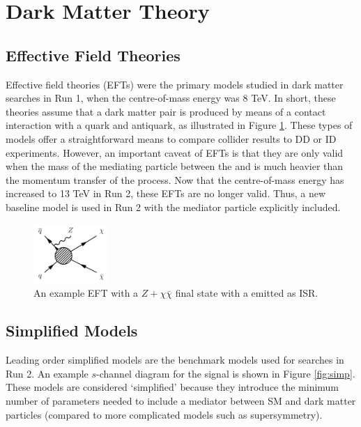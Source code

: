 \label{chapter:theory}

\section{Dark Matter Theory}

\subsection{Effective Field Theories}

Effective field theories (EFTs) were the primary models studied in \etmissX dark matter searches in Run 1, when the centre-of-mass energy was 8 TeV. In short, these theories assume that a dark matter pair is produced by means of a contact interaction with a quark and antiquark, as illustrated in Figure \ref{fig:eft}. These types of models offer a straightforward means to compare collider results to DD or ID experiments. However, an important caveat of EFTs is that they are only valid when the mass of the mediating particle between the \chichi and \qq is much heavier than the momentum transfer of the process. Now that the centre-of-mass energy has increased to 13 TeV in Run 2, these EFTs are no longer valid. Thus, a new baseline model is used in Run 2 with the mediator particle explicitly included.

\begin{figure}[htb]
\centering
\includegraphics[width=0.25\textwidth]{Figures/eft.png}
\caption{An example EFT with a $Z+\chi\bar{\chi}$ final state with a \Z emitted as ISR.}
\label{fig:eft}
\end{figure}

\subsection{Simplified Models}

Leading order simplified models are the benchmark models used for \etmissX searches in Run 2. An example $s$-channel diagram for the \Zetmiss signal is shown in Figure \ref{fig:simp}. These models are considered `simplified' because they introduce the minimum number of parameters needed to include a mediator between SM and dark matter particles (compared to more complicated models such as supersymmetry). 

